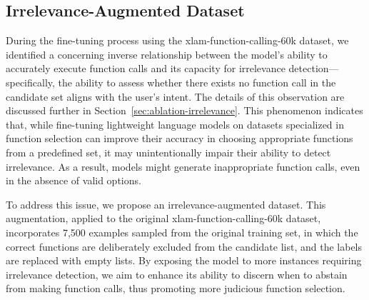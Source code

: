 \documentclass{article}
\begin{document}

\subsection{Irrelevance-Augmented Dataset}

During the fine-tuning process using the xlam-function-calling-60k dataset, we identified a concerning inverse relationship between the model's ability to accurately execute function calls and its capacity for irrelevance detection—specifically, the ability to assess whether there exists no function call in the candidate set aligns with the user’s intent. The details of this observation are discussed further in Section~\ref{sec:ablation-irrelevance}. This phenomenon indicates that, while fine-tuning lightweight language models on datasets specialized in function selection can improve their accuracy in choosing appropriate functions from a predefined set, it may unintentionally impair their ability to detect irrelevance. As a result, models might generate inappropriate function calls, even in the absence of valid options.

To address this issue, we propose an irrelevance-augmented dataset. This augmentation, applied to the original xlam-function-calling-60k dataset, incorporates 7,500 examples sampled from the original training set, in which the correct functions are deliberately excluded from the candidate list, and the labels are replaced with empty lists. By exposing the model to more instances requiring irrelevance detection, we aim to enhance its ability to discern when to abstain from making function calls, thus promoting more judicious function selection.

\end{document}
